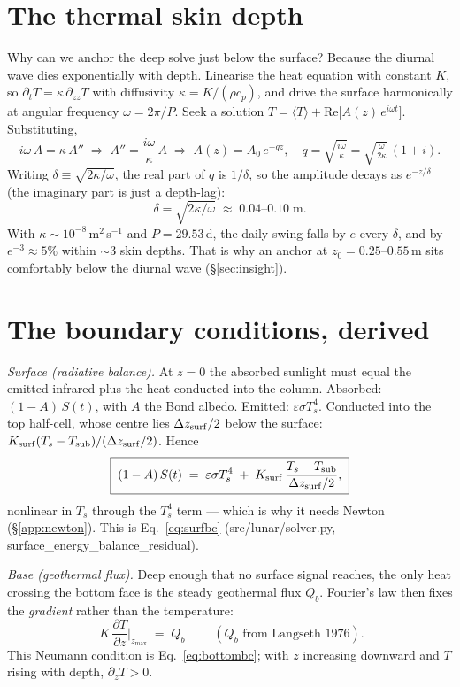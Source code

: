 \documentclass[11pt]{report}
\newcommand{\Tm}{\langle T\rangle}
\newcommand{\code}[1]{{\ttfamily\small #1}}
\begin{document}
\section{The thermal skin depth}\label{app:skin}
Why can we anchor the deep solve just below the surface? Because the diurnal wave
dies exponentially with depth. Linearise the heat equation with constant $K$, so
$\partial_t T = \kappa\,\partial_{zz}T$ with diffusivity $\kappa=K/(\rho c_p)$,
and drive the surface harmonically at angular frequency $\omega=2\pi/P$. Seek a
solution $T=\Tm + \mathrm{Re}\big[A(z)\,e^{i\omega t}\big]$. Substituting,
\[
i\omega\,A = \kappa\,A'' \;\Rightarrow\; A'' = \frac{i\omega}{\kappa}\,A
\;\Rightarrow\; A(z) = A_0\,e^{-qz},\quad
q=\sqrt{\tfrac{i\omega}{\kappa}}=\sqrt{\tfrac{\omega}{2\kappa}}\,(1+i).
\]
Writing $\delta \equiv \sqrt{2\kappa/\omega}$, the real part of $q$ is $1/\delta$,
so the amplitude decays as $e^{-z/\delta}$ (the imaginary part is just a
depth-lag):
\[
\boxed{\;\delta = \sqrt{2\kappa/\omega}\;\approx\;0.04\text{--}0.10\;\text{m}.\;}
\]
With $\kappa\sim10^{-8}$\,m$^2$\,s$^{-1}$ and $P=29.53$\,d, the daily swing falls
by $e$ every $\delta$, and by $e^{-3}\approx5\%$ within $\sim$3 skin depths. That
is why an anchor at $z_0=0.25$--$0.55$\,m sits comfortably below the diurnal wave
(\S\ref{sec:insight}).

\section{The boundary conditions, derived}\label{app:bc}
\emph{Surface (radiative balance).} At $z=0$ the absorbed sunlight must equal the
emitted infrared plus the heat conducted into the column. Absorbed:
$(1-A)\,S(t)$, with $A$ the Bond albedo. Emitted: $\varepsilon\sigma T_s^4$.
Conducted into the top half-cell, whose centre lies $\Delta z_{\rm surf}/2$ below
the surface: $K_{\rm surf}(T_s-T_{\rm sub})/(\Delta z_{\rm surf}/2)$. Hence
\[
\boxed{\;(1-A)\,S(t) \;=\; \varepsilon\sigma T_s^4
\;+\; K_{\rm surf}\,\frac{T_s-T_{\rm sub}}{\Delta z_{\rm surf}/2},\;}
\]
nonlinear in $T_s$ through the $T_s^4$ term --- which is why it needs Newton
(\S\ref{app:newton}). This is Eq.~\eqref{eq:surfbc}
(\code{src/lunar/solver.py}, \code{surface\_energy\_balance\_residual}).

\emph{Base (geothermal flux).} Deep enough that no surface signal reaches, the
only heat crossing the bottom face is the steady geothermal flux $Q_b$. Fourier's
law then fixes the \emph{gradient} rather than the temperature:
\[
\boxed{\;K\,\frac{\partial T}{\partial z}\bigg|_{z_{\max}} \;=\; Q_b\;}
\qquad(Q_b\text{ from Langseth 1976}).
\]
This Neumann condition is Eq.~\eqref{eq:bottombc}; with $z$ increasing downward
and $T$ rising with depth, $\partial_z T>0$.
\end{document}
